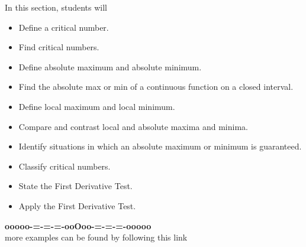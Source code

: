 \documentclass{ximera}
\begin{document}
\begin{sectionOutcomes}
In this section, students will 

\begin{itemize}
\item Define a critical number.
\item Find critical numbers.
\item Define absolute maximum and absolute minimum.
\item Find the absolute max or min of a continuous function on a closed interval.
\item Define local maximum and local minimum.
\item Compare and contrast local and absolute maxima and minima.
\item Identify situations in which an absolute maximum or minimum is guaranteed.
\item Classify critical numbers.
\item State the First Derivative Test.
\item Apply the First Derivative Test.
\end{itemize}
\end{sectionOutcomes}











\begin{onlineOnly}
\begin{center}
\textbf{\textcolor{green!50!black}{ooooo-=-=-=-ooOoo-=-=-=-ooooo}} \\

more examples can be found by following this link\\ 

\end{center}
\end{onlineOnly}
\end{document}
